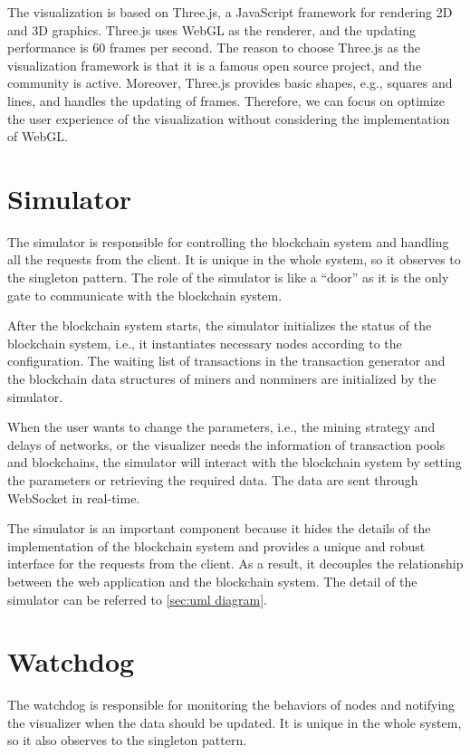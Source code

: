 The visualization is based on Three.js, a JavaScript framework for rendering 2D and 3D graphics. Three.js uses WebGL as the renderer, and the updating performance is 60 frames per second. The reason to choose Three.js as the visualization framework is that it is a famous open source project, and the community is active. Moreover, Three.js provides basic shapes, e.g., squares and lines, and handles the updating of frames. Therefore, we can focus on optimize the user experience of the visualization without considering the implementation of WebGL.

\section{Simulator}

The simulator is responsible for controlling the blockchain system and handling all the requests from the client. It is unique in the whole system, so it observes to the singleton pattern. The role of the simulator is like a ``door'' as it is the only gate to communicate with the blockchain system.

After the blockchain system starts, the simulator initializes the status of the blockchain system, i.e., it instantiates necessary nodes according to the configuration. The waiting list of transactions in the transaction generator and the blockchain data structures of miners and nonminers are initialized by the simulator. 

When the user wants to change the parameters, i.e., the mining strategy and delays of networks, or the visualizer needs the information of transaction pools and blockchains, the simulator will interact with the blockchain system by setting the parameters or retrieving the required data. The data are sent through WebSocket in real-time.

The simulator is an important component because it hides the details of the implementation of the blockchain system and provides a unique and robust interface for the requests from the client. As a result, it decouples the relationship between the web application and the blockchain system. The detail of the simulator can be referred to \ref{sec:uml diagram}.

\section{Watchdog}

The watchdog is responsible for monitoring the behaviors of nodes and notifying the visualizer when the data should be updated. It is unique in the whole system, so it also observes to the singleton pattern.

